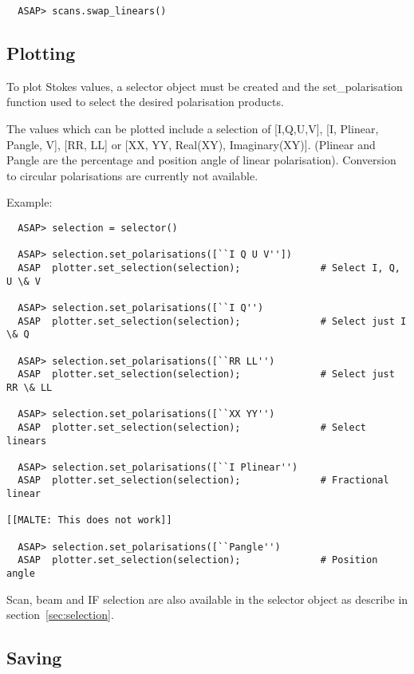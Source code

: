 \documentclass[11pt]{article}
\begin{document}
\begin{verbatim}
  ASAP> scans.swap_linears()
\end{verbatim}

\subsection{Plotting}
\label{sec:polplot}

To plot Stokes values, a selector object
must be created and the set\_polarisation function used to select the
desired polarisation products.

The values which can be plotted include a selection of [I,Q,U,V], [I,
Plinear, Pangle, V], [RR, LL] or [XX, YY, Real(XY),
Imaginary(XY)]. (Plinear and Pangle are the percentage and position
angle of linear polarisation). Conversion to circular polarisations
are currently not available.

Example:

\begin{verbatim}
  ASAP> selection = selector()

  ASAP> selection.set_polarisations([``I Q U V''])
  ASAP  plotter.set_selection(selection);              # Select I, Q, U \& V

  ASAP> selection.set_polarisations([``I Q'')
  ASAP  plotter.set_selection(selection);              # Select just I \& Q

  ASAP> selection.set_polarisations([``RR LL'')
  ASAP  plotter.set_selection(selection);              # Select just RR \& LL

  ASAP> selection.set_polarisations([``XX YY'')
  ASAP  plotter.set_selection(selection);              # Select linears

  ASAP> selection.set_polarisations([``I Plinear'')
  ASAP  plotter.set_selection(selection);              # Fractional linear

[[MALTE: This does not work]]

  ASAP> selection.set_polarisations([``Pangle'')
  ASAP  plotter.set_selection(selection);              # Position angle

\end{verbatim}

Scan, beam and IF selection are also available in the selector object as
describe in section~\ref{sec:selection}.

\subsection{Saving}
\end{document}
